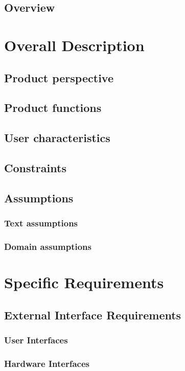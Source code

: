 \documentclass[11pt,a4paper]{report}
\begin{document}
\section{Overview}
\chapter{Overall Description}
\section{Product perspective}
\section{Product functions}
\section{User characteristics}
\section{Constraints}
\section{Assumptions}
\subsection{Text assumptions}
\subsection{Domain assumptions}
\chapter{Specific Requirements}
\section{External Interface Requirements}
\subsection{User Interfaces}
\subsection{Hardware Interfaces}
\end{document}
